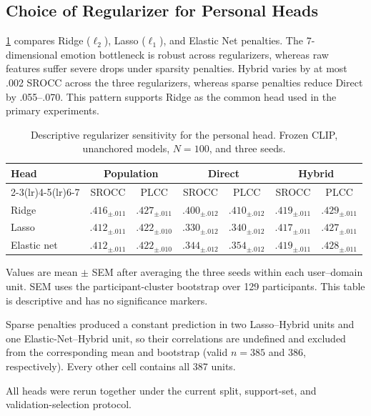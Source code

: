 \documentclass[10pt,twocolumn,letterpaper]{article}
\begin{document}
\subsection{Choice of Regularizer for Personal Heads}
\cref{tab:regularizer} compares Ridge ($\ell_2$), Lasso ($\ell_1$), and Elastic Net penalties. The 7-dimensional emotion bottleneck is robust across regularizers, whereas raw features suffer severe drops under sparsity penalties.
Hybrid varies by at most .002 SROCC across the three regularizers, whereas
sparse penalties reduce Direct by .055--.070. This pattern supports Ridge as
the common head used in the primary experiments.

\begin{table}[!tbp]
\centering
\begin{threeparttable}
\caption{Descriptive regularizer sensitivity for the personal head. Frozen
CLIP, unanchored models, $N=100$, and three seeds.}
\label{tab:regularizer}
\footnotesize
\setlength{\tabcolsep}{4pt}
    \begin{tabular}{@{}l cc cc cc@{}}
        \toprule
        \multirow{2}{*}{Head} & \multicolumn{2}{c}{Population} & \multicolumn{2}{c}{Direct} & \multicolumn{2}{c}{Hybrid} \\
        \cmidrule(lr){2-3}\cmidrule(lr){4-5}\cmidrule(lr){6-7}
        & SROCC & PLCC & SROCC & PLCC & SROCC & PLCC \\
        \midrule
        Ridge       & $.416_{\pm .011}$ & $.427_{\pm .011}$ & $.400_{\pm .012}$ & $.410_{\pm .012}$ & $.419_{\pm .011}$ & $.429_{\pm .011}$ \\
        Lasso       & $.412_{\pm .011}$ & $.422_{\pm .010}$ & $.330_{\pm .012}$ & $.340_{\pm .012}$ & $.417_{\pm .011}$ & $.427_{\pm .011}$ \\
        Elastic net & $.412_{\pm .011}$ & $.422_{\pm .010}$ & $.344_{\pm .012}$ & $.354_{\pm .012}$ & $.419_{\pm .011}$ & $.428_{\pm .011}$ \\
        \bottomrule
    \end{tabular}
\begin{tablenotes}[flushleft]\footnotesize
    \item Values are mean $\pm$ SEM after averaging the three seeds within each user--domain unit. SEM uses the participant-cluster bootstrap over 129 participants. This table is descriptive and has no significance markers.
    \item Sparse penalties produced a constant prediction in two Lasso--Hybrid units and one Elastic-Net--Hybrid unit, so their correlations are undefined and excluded from the corresponding mean and bootstrap (valid $n=385$ and $386$, respectively). Every other cell contains all 387 units.
    \item All heads were rerun together under the current split, support-set,
    and validation-selection protocol.
\end{tablenotes}
\end{threeparttable}
\end{table}
\end{document}

